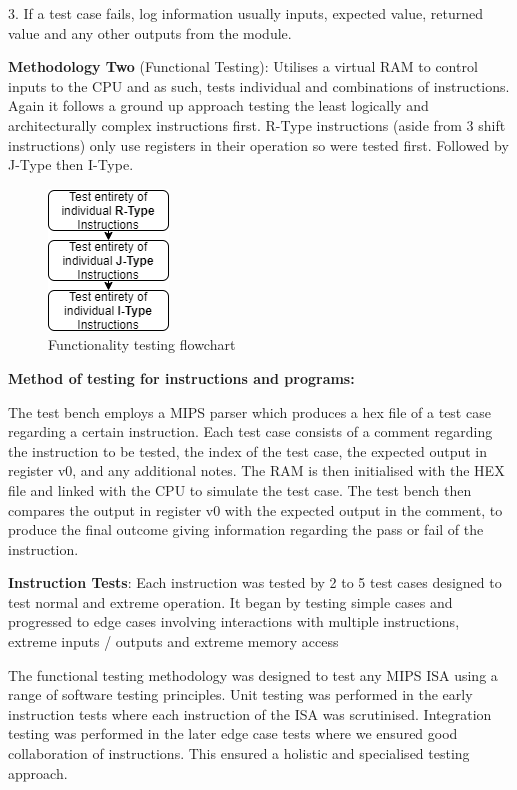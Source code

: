 \documentclass[10pt]{datasheet}
\begin{document}
\vfill\break

3. If a test case fails, log information usually inputs, expected value, returned value and any other outputs from the module.

 



\textbf{Methodology Two} (Functional Testing): Utilises a virtual RAM to control inputs to the CPU and as such, tests individual and combinations of instructions. Again it follows a ground up approach testing the least logically and architecturally complex instructions first. R-Type instructions (aside from 3 shift instructions) only use registers in their operation so were tested first. Followed by J-Type then I-Type.

\begin{figure}[h]
    \centering
    \includegraphics[scale=0.7]{Assets/functionalflow (1).PNG}
    \captionsetup{justification=centering}
    \caption{Functionality testing flowchart}
\end{figure}

\textbf{Method of testing for instructions and programs:}

The test bench employs a MIPS parser which produces a hex file of a test case regarding a certain instruction. Each test case consists of a comment regarding the instruction to be tested, the index of the test case, the expected output in register v0, and any additional notes. The RAM is then initialised with the HEX file and linked with the CPU to simulate the test case. The test bench then compares the output in register v0 with the expected output in the comment, to produce the final outcome giving information regarding the pass or fail of the instruction.

\textbf{Instruction Tests}: Each instruction was tested by 2 to 5 test cases designed to test normal and extreme operation. It began by testing simple cases and progressed to edge cases involving interactions with multiple instructions, extreme inputs / outputs and extreme memory access

The functional testing methodology was designed to test any MIPS ISA using a range of software testing principles. Unit testing was performed in the early instruction tests where each instruction of the ISA was scrutinised. Integration testing was performed in the later edge case tests where we ensured good collaboration of instructions. This ensured a holistic and specialised testing approach. 
\end{document}
